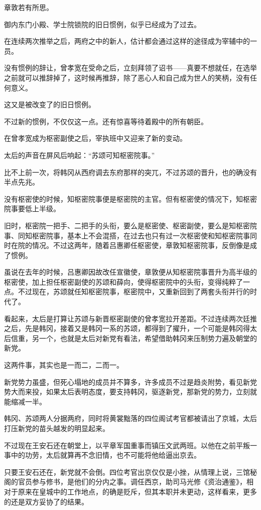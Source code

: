 章敦若有所思。

御内东门小殿、学士院锁院的旧日惯例，似乎已经成为了过去。

在连续两次推举之后，两府之中的新人，估计都会通过这样的途径成为宰辅中的一员。

没有惯例的辞让，曾孝宽在受命之后，立刻拜领了诏书——真要不想就任，在选举之前就可以推辞掉了，这时候再推辞，除了恶心人和自己成为世人的笑柄，没有任何意义。

这又是被改变了的旧日惯例。

不过新的惯例，不仅仅这一点。还有惊喜等待着殿中的所有朝臣。

在曾孝宽成为枢密副使之后，宰执班中又迎来了新的变动。

太后的声音在屏风后响起：“苏颂可知枢密院事。”

比不上前一次，将韩冈从西府调去东府那样的突兀，不过苏颂的晋升，也的确没有半点先兆。

没有枢密使的时候，知枢密院事便是枢密院的主官。但有枢密使的情况下，知枢密院事要低上半级。

旧时，枢密院一把手、二把手的头衔，要么是枢密使、枢密副使，要么是知枢密院事、同知枢密院事，基本上不会混搭，在过去也只有过一次枢密使和知枢密院事同时在院的情况。不过这两年，随着吕惠卿任枢密使，章敦知枢密院事，反倒像是成了惯例。

虽说在去年的时候，吕惠卿因故改任宣徽使，章敦便从知枢密院事晋升为高半级的枢密使，加上担任枢密副使的苏颂和薛向，使得枢密院中的头衔，变得纯粹了一点。不过现在，苏颂就任知枢密院事，枢密院中，又重新回到了两套头衔并行的时代了。

看起来，太后是打算让苏颂与新晋枢密副使的曾孝宽拉开差距。不过连续两次廷推之后，先是韩冈，接着又是韩冈一系的苏颂，都得到了擢升，一个可能是韩冈得太后信重，另一个，也就是太后对新党有看法，希望借助韩冈来压制势力遍及朝堂的新党。

这两件事，其实也是一而二，二而一。

新党势力虽盛，但死心塌地的成员并不算多，许多成员不过是趋炎附势，看见新党势大而来投，如果太后表明态度，要支持韩冈，驱逐新党，那新党的势力，立刻就能缩减一半。

韩冈、苏颂两人分据两府，同时将黄裳黜落的四位阁试考官都被请出了京城，太后打压新党的苗头越发的明显起来。

不过现在王安石还在朝堂上，以平章军国重事而镇压文武两班。以他在之前平叛一事中的功劳，太后就算再不念旧情，也不可能将他给逼出京去。

只要王安石还在，新党就不会倒。四位考官出京仅仅是小挫，从情理上说，三馆秘阁的官员参与修书，是他们的分内之事。调任西京，助司马光修《资治通鉴》，相对于原来在皇城中的工作地点，的确是贬斥，但其本职并未更动，这样看来，更多的还是双方妥协了的结果。

